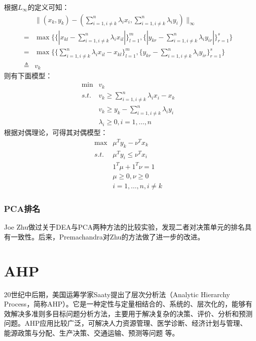 根据$L_{\infty}$的定义可知：
\begin{equation}\label{eq:infinitynorm}
  \begin{array}{ll}
     & \|(x_k,y_k) - (\sum\limits_{i=1, i \ne k}^n \lambda_i x_i,\sum\limits_{i=1, i \ne k}^n \lambda_i y_i)\|_{\infty} \\
     = & \max\bigg\{\big\{|x_{kl} - \sum\limits_{i = 1, i\ne k}^n \lambda_i x_{il}|\big\}_{l=1}^m,\big\{|y_{kr} - \sum\limits_{i = 1, i\ne k}^n \lambda_i y_{ir}|\big\}_{r=1}^s\bigg\} \\
     = & \max\bigg\{\big\{\sum\limits_{i = 1, i\ne k}^n \lambda_i x_{il} - x_{kl}\big\}_{l=1}^m,\big\{y_{kr} - \sum\limits_{i = 1, i\ne k}^n \lambda_i y_{ir}\big\}_{r=1}^s\bigg\}\\
     \triangleq & v_k
  \end{array}
\end{equation}
则有下面模型：
\begin{equation}
  \begin{array}{ll}
    \min & v_k \\
    \textit{s.t.} & v_k \ge \sum\limits_{i=1, i \ne k}^n \lambda_i x_i - x_k\\
    & v_k \ge y_k - \sum\limits_{i=1, i \ne k}^n \lambda_i y_i\\
    & \lambda_i \ge 0, i =1,\ldots, n
  \end{array}
\end{equation}
根据对偶理论，可得其对偶模型：
\begin{equation}
  \begin{array}{ll}
    \max & \mu^T y_k - \nu^T x_k\\
    \textit{s.t.} & \mu^T y_i \le \nu^T x_i\\
    & 1^T \mu + 1^T \nu = 1\\
    &\mu \ge 0, \nu \ge 0\\
    & i = 1,\ldots, n, i \ne k
  \end{array}
\end{equation}

\subsection{PCA排名}
Joe Zhu\cite{zhu1998data}做过关于DEA与PCA两种方法的比较实验，发现二者对决策单元的排名具有一致性。后来，Premachandra\cite{premachandra2001note}对Zhu的方法做了进一步的改进。

\chapter{AHP}
20世纪中后期，美国运筹学家Saaty\cite{saaty1977scaling,saaty1980analytic}提出了层次分析法（Analytic Hierarchy Process，简称AHP）。它是一种定性与定量相结合的、系统的、层次化的，能够有效解决多准则多目标问题分析方法，主要用于解决复杂的决策、评价、分析和预测问题。AHP应用比较广泛，可解决人力资源管理\cite{saaty2007analytic}、医学诊断\cite{saaty1998diagnosis}、经济计划与管理、能源政策与分配、生产决策、交通运输、预测等问题
\cite{ercsan2012use} 等。

